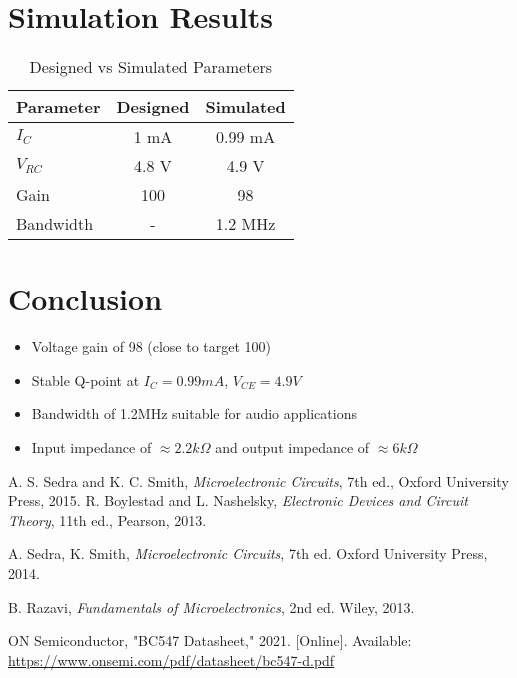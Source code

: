\documentclass[conference]{IEEEtran}
\begin{document}
\newpage
\section{Simulation Results}
\begin{table}[h]
    \centering
    \begin{tabular}{lcc}
        \toprule
        Parameter & Designed & Simulated \\
        \midrule
        $I_C$ & 1 mA & 0.99 mA \\
        $V_{RC}$ & 4.8 V & 4.9 V \\
        Gain & 100 & 98 \\
        Bandwidth & - & 1.2 MHz \\
        \bottomrule
    \end{tabular}
    \caption{Designed vs Simulated Parameters}
\end{table}

\section{Conclusion}
\begin{itemize}
    \item Voltage gain of 98 (close to target 100)
    \item Stable Q-point at $I_C=0.99mA$, $V_{CE}=4.9V$
    \item Bandwidth of 1.2MHz suitable for audio applications
    \item Input impedance of $\approx 2.2k\Omega$ and output impedance of $\approx 6k\Omega$
\end{itemize}

\begin{thebibliography}{9}
 A. S. Sedra and K. C. Smith, \textit{Microelectronic Circuits}, 7th ed., Oxford University Press, 2015.
 R. Boylestad and L. Nashelsky, \textit{Electronic Devices and Circuit Theory}, 11th ed., Pearson, 2013.

	
    A. Sedra, K. Smith, \textit{Microelectronic Circuits}, 7th ed. Oxford University Press, 2014.

    B. Razavi, \textit{Fundamentals of Microelectronics}, 2nd ed. Wiley, 2013.

    ON Semiconductor, "BC547 Datasheet," 2021. [Online]. Available: \url{https://www.onsemi.com/pdf/datasheet/bc547-d.pdf}
    

\end{thebibliography}
\end{document}
